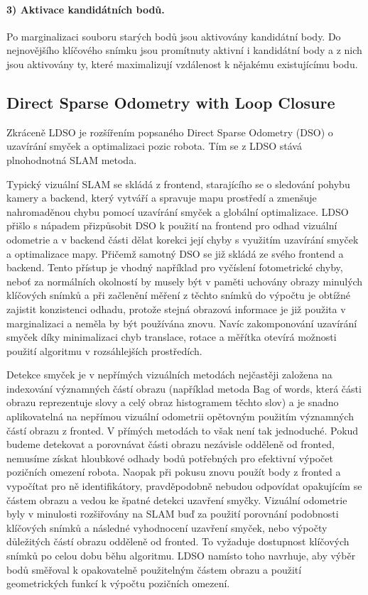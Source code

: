 \documentclass[12pt,a4paper]{article}
\begin{document}
\paragraph*{3) Aktivace kandidátních bodů.} Po marginalizaci souboru starých bodů jsou aktivovány kandidátní body. Do nejnovějšího klíčového snímku jsou promítnuty aktivní i kandidátní body a z nich jsou aktivovány ty, které maximalizují vzdálenost k nějakému existujícímu bodu.

\subsection{Direct Sparse Odometry with Loop Closure}
Zkráceně LDSO je rozšířením popsaného Direct Sparse Odometry (DSO) o uzavírání smyček a optimalizaci pozic robota. Tím se z LDSO stává plnohodnotná SLAM metoda.

Typický vizuální SLAM se skládá z frontend, starajícího se o sledování pohybu kamery a backend, který vytváří a spravuje mapu prostředí a zmenšuje nahromaděnou chybu pomocí uzavírání smyček a globální optimalizace. LDSO přišlo s nápadem přizpůsobit DSO k použití na frontend pro odhad vizuální odometrie a v backend části dělat korekci její chyby s využitím uzavírání smyček a optimalizace mapy. Přičemž samotný DSO se již skládá ze svého frontend a backend. Tento přístup je vhodný například pro vyčíslení fotometrické chyby, neboť za normálních okolností by musely být v paměti uchovány obrazy minulých klíčových snímků a při začlenění měření z těchto snímků do výpočtu je obtížné zajistit konzistenci odhadu, protože stejná obrazová informace je již použita v marginalizaci a neměla by být používána znovu. Navíc zakomponování uzavírání smyček díky minimalizaci chyb translace, rotace a měřítka otevírá možnosti použití algoritmu v rozsáhlejších prostředích.

Detekce smyček je v nepřímých vizuálních metodách nejčastěji založena na indexování významných částí obrazu (například metoda Bag of words, která části obrazu reprezentuje slovy a celý obraz histogramem těchto slov) a je snadno aplikovatelná na nepřímou vizuální odometrii opětovným použitím významných částí obrazu z fronted. V přímých metodách to však není tak jednoduché. Pokud budeme detekovat a porovnávat části obrazu nezávisle odděleně od fronted, nemusíme získat hloubkové odhady bodů potřebných pro efektivní výpočet pozičních omezení robota. Naopak při pokusu znovu použít body z fronted a vypočítat pro ně identifikátory, pravděpodobně nebudou odpovídat opakujícím se částem obrazu a vedou ke špatné detekci uzavření smyčky. Vizuální odometrie byly v minulosti rozšiřovány na SLAM buď za použití porovnání podobnosti klíčových snímků a následné vyhodnocení uzavření smyček, nebo výpočty důležitých částí obrazu odděleně od fronted. To vyžaduje dostupnost klíčových snímků po celou dobu běhu algoritmu. LDSO namísto toho navrhuje, aby výběr bodů směřoval k opakovatelně použitelným částem obrazu a použití geometrických funkcí k výpočtu pozičních omezení.
\end{document}

